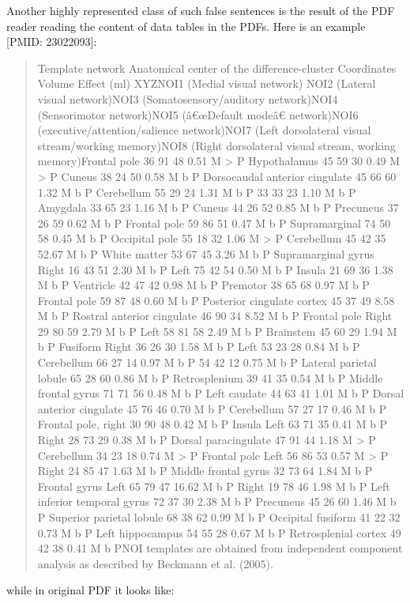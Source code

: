 Another highly represented class of such false sentences is the result of the PDF reader reading the content of data tables in the PDFs.
Here is an example [PMID: 23022093]:
\begin{quote}
Template network Anatomical center of the difference-cluster Coordinates Volume Effect (ml) XYZNOI1 (Medial visual network) NOI2 (Lateral visual network)NOI3 (Somatosensory/auditory network)NOI4 (Sensorimotor network)NOI5 (â€œDefault modeâ€  network)NOI6 (executive/attention/salience network)NOI7 (Left dorsolateral visual stream/working memory)NOI8 (Right dorsolateral visual stream, working memory)Frontal pole 36 91 48 0.51 M > P Hypothalamus 45 59 30 0.49 M > P Cuneus 38 24 50 0.58 M b P Dorsocaudal anterior cingulate 45 66 60 1.32 M b P Cerebellum 55 29 24 1.31 M b P 33 33 23 1.10 M b P Amygdala 33 65 23 1.16 M b P Cuneus 44 26 52 0.85 M b P Precuneus 37 26 59 0.62 M b P Frontal pole 59 86 51 0.47 M b P Supramarginal 74 50 58 0.45 M b P Occipital pole 55 18 32 1.06 M > P Cerebellum 45 42 35 52.67 M b P White matter 53 67 45 3.26 M b P Supramarginal gyrus Right 16 43 51 2.30 M b P Left 75 42 54 0.50 M b P Insula 21 69 36 1.38 M b P Ventricle 42 47 42 0.98 M b P Premotor 38 65 68 0.97 M b P Frontal pole 59 87 48 0.60 M b P Posterior cingulate cortex 45 37 49 8.58 M b P Rostral anterior cingulate 46 90 34 8.52 M b P Frontal pole Right 29 80 59 2.79 M b P Left 58 81 58 2.49 M b P Brainstem 45 60 29 1.94 M b P Fusiform Right 36 26 30 1.58 M b P Left 53 23 28 0.84 M b P Cerebellum 66 27 14 0.97 M b P 54 42 12 0.75 M b P Lateral parietal lobule 65 28 60 0.86 M b P Retrosplenium 39 41 35 0.54 M b P Middle frontal gyrus 71 71 56 0.48 M b P Left caudate 44 63 41 1.01 M b P Dorsal anterior cingulate 45 76 46 0.70 M b P Cerebellum 57 27 17 0.46 M b P Frontal pole, right 30 90 48 0.42 M b P Insula Left 63 71 35 0.41 M b P Right 28 73 29 0.38 M b P Dorsal paracingulate 47 91 44 1.18 M > P Cerebellum 34 23 18 0.74 M > P Frontal pole Left 56 86 53 0.57 M > P Right 24 85 47 1.63 M b P Middle frontal gyrus 32 73 64 1.84 M b P Frontal gyrus Left 65 79 47 16.62 M b P Right 19 78 46 1.98 M b P Left inferior temporal gyrus 72 37 30 2.38 M b P Precuneus 45 26 60 1.46 M b P Superior parietal lobule 68 38 62 0.99 M b P Occipital fusiform 41 22 32 0.73 M b P Left hippocampus 54 55 28 0.67 M b P Retrosplenial cortex 49 42 38 0.41 M b PNOI templates are obtained from independent component analysis as described by Beckmann et al. (2005). 
\end{quote}
while in original PDF it looks like:
